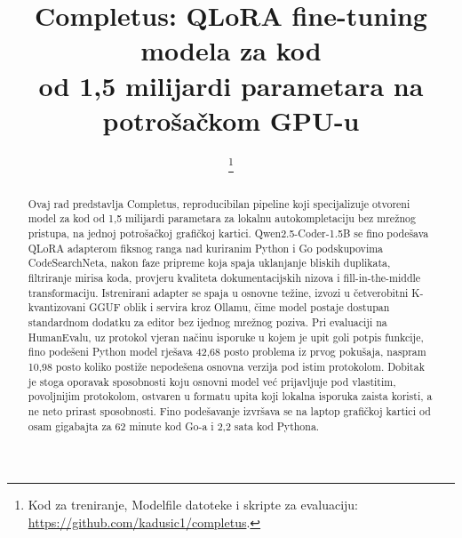 \documentclass[10pt,conference,a4paper]{IEEEtran}
\begin{document}
\title{Completus: QLoRA fine-tuning modela za kod\\
od 1,5 milijardi parametara na potrošačkom GPU-u}

\author{
\and
{}
\and
{}
%
\thanks{Kod za treniranje, Modelfile datoteke i skripte za evaluaciju:
\url{https://github.com/kadusic1/completus}.}}

\maketitle
{}

\begin{abstract}
Ovaj rad predstavlja Completus, reproducibilan pipeline koji specijalizuje
otvoreni model za kod od 1,5 milijardi parametara za lokalnu autokompletaciju
bez mrežnog pristupa, na jednoj potrošačkoj grafičkoj kartici.
Qwen2.5-Coder-1.5B se fino podešava QLoRA adapterom fiksnog ranga nad
kuriranim Python i Go podskupovima CodeSearchNeta, nakon faze pripreme koja
spaja uklanjanje bliskih duplikata, filtriranje mirisa koda, provjeru
kvaliteta dokumentacijskih nizova i fill-in-the-middle transformaciju.
Istrenirani adapter se spaja u osnovne težine, izvozi u četverobitni
K-kvantizovani GGUF oblik i servira kroz Ollamu, čime model postaje dostupan
standardnom dodatku za editor bez ijednog mrežnog poziva. Pri evaluaciji na
HumanEvalu, uz protokol vjeran načinu isporuke u kojem je upit goli potpis
funkcije, fino podešeni Python model rješava 42,68 posto problema iz prvog
pokušaja, naspram 10,98 posto koliko postiže nepodešena osnovna verzija pod
istim protokolom. Dobitak je stoga oporavak sposobnosti koju osnovni model
već prijavljuje pod vlastitim, povoljnijim protokolom, ostvaren u formatu
upita koji lokalna isporuka zaista koristi, a ne neto prirast sposobnosti.
Fino podešavanje izvršava se na laptop grafičkoj kartici od osam gigabajta za
62 minute kod Go-a i 2,2 sata kod Pythona.
\end{abstract}
\end{document}
